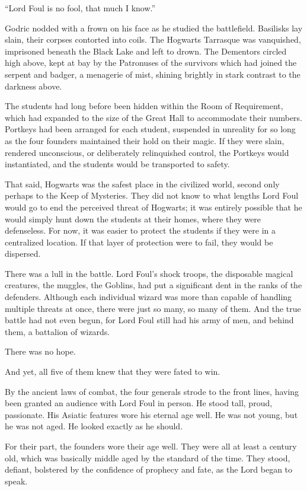 “Lord Foul is no fool, that much I know.”

Godric nodded with a frown on his face as he studied the battlefield. Basilisks lay slain, their corpses contorted into coils. The Hogwarts Tarrasque was vanquished, imprisoned beneath the Black Lake and left to drown. The Dementors circled high above, kept at bay by the Patronuses of the survivors which had joined the serpent and badger, a menagerie of mist, shining brightly in stark contrast to the darkness above.

The students had long before been hidden within the Room of Requirement, which had expanded to the size of the Great Hall to accommodate their numbers. Portkeys had been arranged for each student, suspended in unreality for so long as the four founders maintained their hold on their magic. If they were slain, rendered unconscious, or deliberately relinquished control, the Portkeys would instantiated, and the students would be transported to safety.

That said, Hogwarts was the safest place in the civilized world, second only perhaps to the Keep of Mysteries. They did not know to what lengths Lord Foul would go to end the perceived threat of Hogwarts; it was entirely possible that he would simply hunt down the students at their homes, where they were defenseless. For now, it was easier to protect the students if they were in a centralized location. If that layer of protection were to fail, they would be dispersed.

There was a lull in the battle. Lord Foul’s shock troops, the disposable magical creatures, the muggles, the Goblins, had put a significant dent in the ranks of the defenders. Although each individual wizard was more than capable of handling multiple threats at once, there were just so many, so many of them. And the true battle had not even begun, for Lord Foul still had his army of men, and behind them, a battalion of wizards.

There was no hope.

And yet, all five of them knew that they were fated to win.

By the ancient laws of combat, the four generals strode to the front lines, having been granted an audience with Lord Foul in person. He stood tall, proud, passionate. His Asiatic features wore his eternal age well. He was not young, but he was not aged. He looked exactly as he should.

For their part, the founders wore their age well. They were all at least a century old, which was basically middle aged by the standard of the time. They stood, defiant, bolstered by the confidence of prophecy and fate, as the Lord began to speak.

